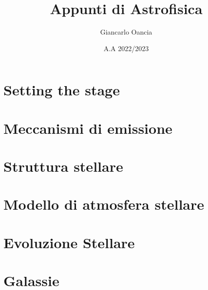 \documentclass[a4paper, 11pt]{book} %
\begin{document}
\frontmatter
\author{Giancarlo Oancia}
\title{Appunti di Astrofisica}
\date{A.A 2022/2023} %
\tableofcontents

\mainmatter
\chapter{Setting the stage}



\chapter{Meccanismi di emissione}







\chapter{Struttura stellare}









\chapter{Modello di atmosfera stellare}



\chapter{Evoluzione Stellare}





\chapter{Galassie}




\end{document}
